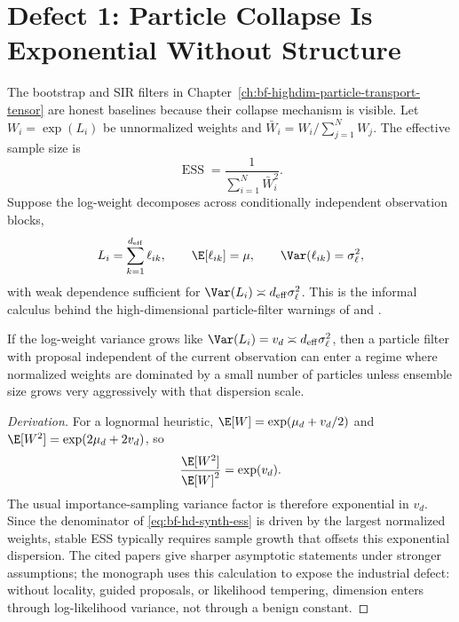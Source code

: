 \section[Particle Collapse]{Defect 1: Particle Collapse Is Exponential Without Structure}
\label{sec:bf-hd-defect-particles}

The bootstrap and SIR filters in Chapter~\ref{ch:bf-highdim-particle-transport-tensor}
are honest baselines because their collapse mechanism is visible.  Let
$W_i=\exp(L_i)$ be unnormalized weights and
$\bar W_i=W_i/\sum_{j=1}^N W_j$.  The effective sample size is
\begin{equation}
  \operatorname{ESS}=\frac{1}{\sum_{i=1}^N \bar W_i^2}.
  \label{eq:bf-hd-synth-ess}
\end{equation}
Suppose the log-weight decomposes across conditionally independent observation
blocks,
\begin{equation}
  L_i=\sum_{k=1}^{d_{\mathrm{eff}}} \ell_{ik},\qquad
  \E[\ell_{ik}]=\mu,\qquad \Var(\ell_{ik})=\sigma_\ell^2,
  \label{eq:bf-hd-synth-logweight}
\end{equation}
with weak dependence sufficient for
\(\Var(L_i)\asymp d_{\mathrm{eff}}\sigma_\ell^2\).  This is the informal
calculus behind the high-dimensional particle-filter warnings of
\citet{bengtsson2008curse} and \citet{snyder2008obstacles}.

\begin{proposition}
\label{prop:bf-hd-particle-collapse-calculus}
If the log-weight variance grows like
\(\Var(L_i)=v_d\asymp d_{\mathrm{eff}}\sigma_\ell^2\), then a particle filter
with proposal independent of the current observation can enter a regime where
normalized weights are dominated by a small number of particles unless ensemble
size grows very aggressively with that dispersion scale.
\end{proposition}

\begin{proof}[Derivation]
For a lognormal heuristic, \(\E[W]=\exp(\mu_d+v_d/2)\) and
\(\E[W^2]=\exp(2\mu_d+2v_d)\), so
\[
  \frac{\E[W^2]}{\E[W]^2}=\exp(v_d).
\]
The usual importance-sampling variance factor is therefore exponential in
\(v_d\).  Since the denominator of \eqref{eq:bf-hd-synth-ess} is driven by the
largest normalized weights, stable ESS typically requires sample growth that
offsets this exponential dispersion.  The cited papers give sharper asymptotic
statements under stronger assumptions; the monograph uses this calculation to
expose the industrial defect: without locality, guided proposals, or likelihood
tempering, dimension enters through log-likelihood variance, not through a
benign constant.
\end{proof}

